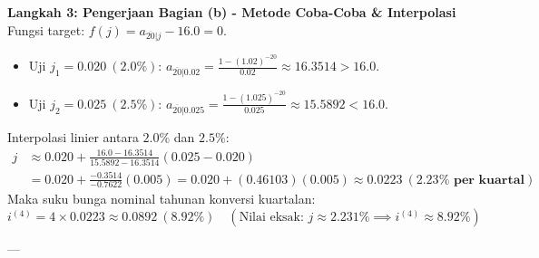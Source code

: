 \documentclass[11pt,a4paper]{article}
\begin{document}
\begin{examplebox}
\textbf{Langkah 3: Pengerjaan Bagian (b) - Metode Coba-Coba \& Interpolasi}
Fungsi target: $f(j) = a_{\overline{20}|j} - 16.0 = 0$.
\begin{itemize}
    \item Uji $j_1 = 0.020 \ (2.0\%)$: $a_{\overline{20}|0.02} = \frac{1 - (1.02)^{-20}}{0.02} \approx 16.3514 > 16.0$.
    \item Uji $j_2 = 0.025 \ (2.5\%)$: $a_{\overline{20}|0.025} = \frac{1 - (1.025)^{-20}}{0.025} \approx 15.5892 < 16.0$.
\end{itemize}
Interpolasi linier antara $2.0\%$ dan $2.5\%$:
\begin{align*}
    j &\approx 0.020 + \frac{16.0 - 16.3514}{15.5892 - 16.3514} (0.025 - 0.020) \\[0.4em]
    &= 0.020 + \frac{-0.3514}{-0.7622} (0.005) = 0.020 + (0.46103)(0.005) \approx \mathbf{0.0223 \ (2.23\% \text{ per kuartal})}
\end{align*}
Maka suku bunga nominal tahunan konversi kuartalan:
\begin{equation*}
    i^{(4)} = 4 \times 0.0223 \approx \mathbf{0.0892 \ (8.92\%)} \quad (\text{Nilai eksak: } j \approx 2.231\% \implies i^{(4)} \approx 8.92\%)
\end{equation*}
\end{examplebox}

---
\end{document}
